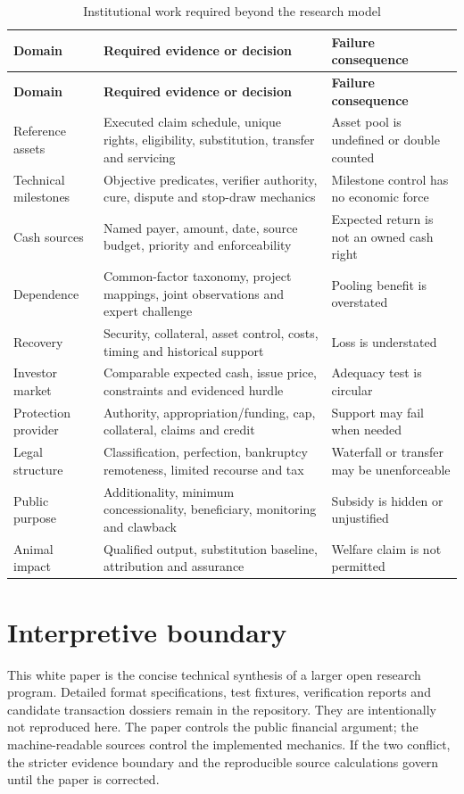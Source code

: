 \documentclass[11pt,a4paper]{article}
\begin{document}
\begin{longtable}{@{}P{0.22\textwidth}P{0.47\textwidth}P{0.22\textwidth}@{}}
\caption{Institutional work required beyond the research model}\label{tab:diligence}\\
\toprule
\textbf{Domain} & \textbf{Required evidence or decision} & \textbf{Failure consequence} \\
\midrule
\endfirsthead
\toprule
\textbf{Domain} & \textbf{Required evidence or decision} & \textbf{Failure consequence} \\
\midrule
\endhead
Reference assets & Executed claim schedule, unique rights, eligibility, substitution, transfer and servicing & Asset pool is undefined or double counted \\
Technical milestones & Objective predicates, verifier authority, cure, dispute and stop-draw mechanics & Milestone control has no economic force \\
Cash sources & Named payer, amount, date, source budget, priority and enforceability & Expected return is not an owned cash right \\
Dependence & Common-factor taxonomy, project mappings, joint observations and expert challenge & Pooling benefit is overstated \\
Recovery & Security, collateral, asset control, costs, timing and historical support & Loss is understated \\
Investor market & Comparable expected cash, issue price, constraints and evidenced hurdle & Adequacy test is circular \\
Protection provider & Authority, appropriation/funding, cap, collateral, claims and credit & Support may fail when needed \\
Legal structure & Classification, perfection, bankruptcy remoteness, limited recourse and tax & Waterfall or transfer may be unenforceable \\
Public purpose & Additionality, minimum concessionality, beneficiary, monitoring and clawback & Subsidy is hidden or unjustified \\
Animal impact & Qualified output, substitution baseline, attribution and assurance & Welfare claim is not permitted \\
\bottomrule
\end{longtable}

\vspace{-\baselineskip}
\enlargethispage{\baselineskip}
\section{Interpretive boundary}

This white paper is the concise technical synthesis of a larger open research program. Detailed format specifications, test fixtures, verification reports and candidate transaction dossiers remain in the repository. They are intentionally not reproduced here. The paper controls the public financial argument; the machine-readable sources control the implemented mechanics. If the two conflict, the stricter evidence boundary and the reproducible source calculations govern until the paper is corrected.
\end{document}
